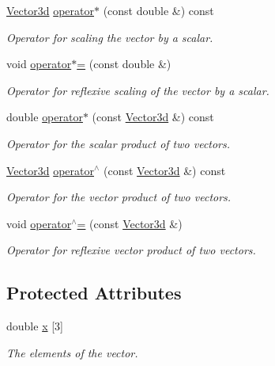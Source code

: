\begin{DoxyCompactItemize}
\hyperlink{classVector3d}{\-Vector3d} \hyperlink{classVector3d_a656a4a90ae5619c4deb7851da2aaa2e8}{operator$\ast$} (const double \&) const 
\begin{DoxyCompactList}\small\item\em \-Operator for scaling the vector by a scalar. \end{DoxyCompactList}\item 
void \hyperlink{classVector3d_a3014b4a7a5feded758421dfb7df4daa2}{operator$\ast$=} (const double \&)
\begin{DoxyCompactList}\small\item\em \-Operator for reflexive scaling of the vector by a scalar. \end{DoxyCompactList}\item 
double \hyperlink{classVector3d_a43b3a3d87cedd5a88539d030a8853590}{operator$\ast$} (const \hyperlink{classVector3d}{\-Vector3d} \&) const 
\begin{DoxyCompactList}\small\item\em \-Operator for the scalar product of two vectors. \end{DoxyCompactList}\item 
\hyperlink{classVector3d}{\-Vector3d} \hyperlink{classVector3d_a3a8254737a895334fc887d98e8446298}{operator$^\wedge$} (const \hyperlink{classVector3d}{\-Vector3d} \&) const 
\begin{DoxyCompactList}\small\item\em \-Operator for the vector product of two vectors. \end{DoxyCompactList}\item 
void \hyperlink{classVector3d_a868e89192951f4a25f63b958ec419f6f}{operator$^\wedge$=} (const \hyperlink{classVector3d}{\-Vector3d} \&)
\begin{DoxyCompactList}\small\item\em \-Operator for reflexive vector product of two vectors. \end{DoxyCompactList}\end{DoxyCompactItemize}
\subsection*{\-Protected \-Attributes}
\begin{DoxyCompactItemize}
\item 
double \hyperlink{classVector3d_ae5e82a2be7cc2e195e56875a5befe509}{x} \mbox{[}3\mbox{]}
\begin{DoxyCompactList}\small\item\em \-The elements of the vector. \end{DoxyCompactList}\end{DoxyCompactItemize}


